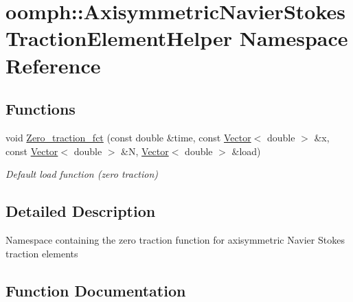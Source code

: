 \hypertarget{namespaceoomph_1_1AxisymmetricNavierStokesTractionElementHelper}{}\section{oomph\+:\+:Axisymmetric\+Navier\+Stokes\+Traction\+Element\+Helper Namespace Reference}
\label{namespaceoomph_1_1AxisymmetricNavierStokesTractionElementHelper}
\subsection*{Functions}
\begin{DoxyCompactItemize}
\item 
void \hyperlink{namespaceoomph_1_1AxisymmetricNavierStokesTractionElementHelper_aea96622278fde43851c31b0a559b829d}{Zero\+\_\+traction\+\_\+fct} (const double \&time, const \hyperlink{classoomph_1_1Vector}{Vector}$<$ double $>$ \&x, const \hyperlink{classoomph_1_1Vector}{Vector}$<$ double $>$ \&N, \hyperlink{classoomph_1_1Vector}{Vector}$<$ double $>$ \&load)
\begin{DoxyCompactList}\small\item\em Default load function (zero traction) \end{DoxyCompactList}\end{DoxyCompactItemize}


\subsection{Detailed Description}
Namespace containing the zero traction function for axisymmetric Navier Stokes traction elements 

\subsection{Function Documentation}
\mbox{\label{namespaceoomph_1_1AxisymmetricNavierStokesTractionElementHelper_aea96622278fde43851c31b0a559b829d}} 
